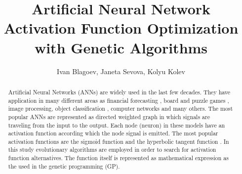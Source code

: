 \documentclass{llncs}
\begin{document}
\title{Artificial Neural Network Activation Function Optimization with Genetic Algorithms}

\author{Ivan Blagoev, Janeta Sevova, Kolyu Kolev}



\maketitle


\begin{abstract}

Artificial Neural Networks (ANNs) are widely used in the last few decades. They have application in many different areas as financial forecasting \cite{atanasova01,balabanov04,tomov01}, board and puzzle games \cite{balabanov01,balabanov03,keremedchiev01}, image processing, object classification \cite{atanasova02}, computer networks \cite{tashev01,tashev02} and many others. The most popular ANNs are represented as directed weighted graph in which signals are traveling from the input to the output. Each node (neuron) in these models have an activation function according which the node signal is emitted. The most popular activation functions are the sigmoid function and the hyperbolic tangent function \cite{zankinski01,balabanov02}. In this study evolutionary algorithms are employed in order to search for activation function alternatives. The function itself is represented as mathematical expression as the used in the genetic programming (GP).

\end{abstract}
\end{document}
